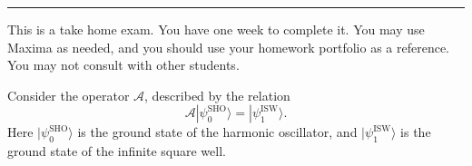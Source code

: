 \documentclass[addpoints]{exam}
\begin{document}
\cellwidth{4em}
\headrule

\begin{coverpages}
  \vskip0.1cm\hrule\vskip0.5cm
   \vskip 1cm This is a take
  home exam.  You have one week to complete it.  You may use Maxima as
  needed, and you should use your homework portfolio as a
  reference. You may not consult with other students.  \vskip 2cm
\begin{center}
\gradetable
\end{center}
\end{coverpages}

\begin{questions}
  \question Consider the operator $\mathcal{A}$, described by the relation
  \[ \mathcal{A}|\psi_0^{\mathrm{SHO}}\rangle =
  |\psi_1^{\mathrm{ISW}}\rangle. \] Here
  $|\psi_0^{\mathrm{SHO}}\rangle$ is the ground state of the harmonic
  oscillator, and $|\psi_1^{\mathrm{ISW}}\rangle$ is the ground state
  of the infinite square well.
  \newpage

  \question
\end{questions}
\end{document}
